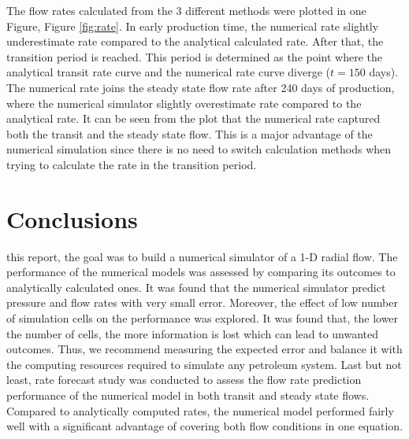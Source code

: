 \documentclass[12pt,letterpaper,titlepage]{article}
\begin{document}
The flow rates calculated from the 3 different methods were plotted in one Figure, Figure \ref{fig:rate}. In early production time, the numerical rate slightly underestimate rate compared to the analytical calculated rate. After that, the transition period is reached. This period is determined as the point where the analytical transit rate curve and the numerical rate curve diverge ($t=150$ days). The numerical rate joins the steady state flow rate after 240 days of production, where the numerical simulator slightly overestimate rate compared to the analytical rate. It can be seen from the plot that the numerical rate captured both the transit and the steady state flow. This is a major advantage of the numerical simulation since there is no need to switch calculation methods when trying to calculate the rate in the transition period.









\section{Conclusions}

\par this report, the goal was to build a numerical simulator of a 1-D radial flow. The performance of the numerical models was assessed by comparing its outcomes to analytically calculated ones. It was found that the numerical simulator predict pressure and flow rates with very small error. 
Moreover, the effect of low number of simulation cells on the performance was explored. It was found that, the lower the number of cells, the more information is lost which can lead to unwanted outcomes. Thus, we recommend measuring the expected error and balance it with the computing resources required to simulate any petroleum system.
Last but not least, rate forecast study was conducted to assess the flow rate prediction performance of the numerical model in both transit and steady state flows. Compared to analytically computed rates, the numerical model performed fairly well with a significant advantage of covering both flow conditions in one equation.
\end{document}
